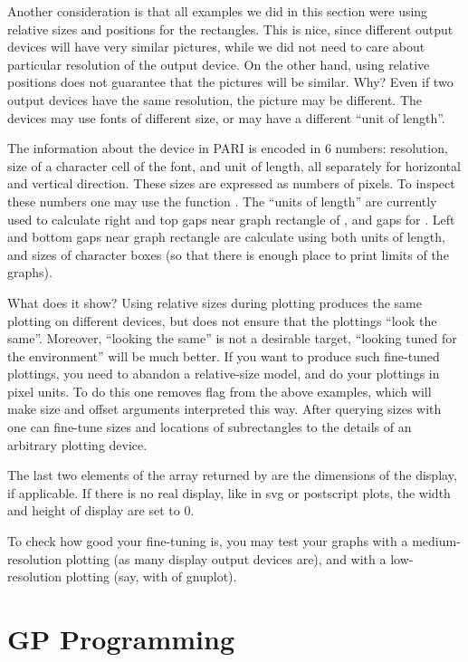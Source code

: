 Another consideration is that all examples we did in this section were
using relative sizes and positions for the rectangles.  This is nice, since
different output devices will have very similar pictures, while we
did not need to care about particular resolution of the output device.
On the other hand,
using relative positions does not guarantee that the pictures will be
similar.  Why?  Even if two output devices have the same resolution,
the picture may be different.  The devices may use fonts of different
size, or may have a different ``unit of length''.

The information about the device in PARI is encoded in 6 numbers: resolution,
size of a character cell of the font, and unit of length, all separately
for horizontal and vertical direction.  These sizes are expressed as
numbers of pixels.  To inspect these numbers one may use the function
.  The ``units of length'' are currently used to calculate
right and top gaps near graph rectangle of , and gaps for
.  Left and bottom gaps near graph rectangle are calculate
using both units of length, and sizes of character boxes (so that there
is enough place to print limits of the graphs).

What does it show?  Using relative sizes during plotting produces
 the same plotting on different devices, but does not
ensure that the plottings ``look the same''.  Moreover, ``looking the
same'' is not a desirable target, ``looking tuned for the environment''
will be much better.  If you want to produce such fine-tuned plottings,
you need to abandon a relative-size model, and do your plottings in
pixel units.  To do this one removes flag  from the above
examples, which will make size and offset arguments interpreted this way.
After querying sizes with  one can fine-tune sizes and
locations of subrectangles to the details of an arbitrary plotting
device.

The last two elements of the array returned by  are the
dimensions of the display, if applicable. If there is no real display, like
in svg or postscript plots, the width and height of display are set to $0$.

To check how good your fine-tuning is, you may test your graphs with a
medium-resolution plotting (as many display output devices are), and
with a low-resolution plotting (say, with  of gnuplot).

\section{GP Programming}

